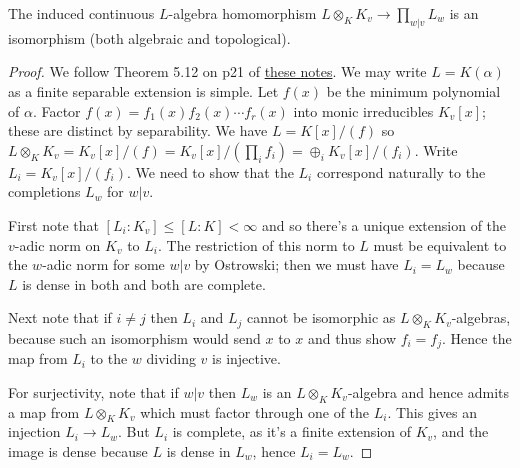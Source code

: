 \begin{theorem}
  \label{IsDedekindDomain.HeightOneSpectrum.adicCompletionComapAlgEquiv}
  The induced continuous $L$-algebra homomorphism $L\otimes_KK_v\to\prod_{w|v}L_w$ is an
  isomorphism (both algebraic and topological).
\end{theorem}
\begin{proof}
  We follow Theorem 5.12 on p21 of \href{https://math.berkeley.edu/~ltomczak/notes/Mich2022/LF_Notes.pdf}
  {these notes}. We may write $L=K(\alpha)$ as a finite separable extension is simple. Let $f(x)$
  be the minimum polynomial of $\alpha$. Factor $f(x)=f_1(x)f_2(x)\cdots f_r(x)$ into
  monic irreducibles $K_v[x]$; these are distinct by separability. We have $L=K[x]/(f)$
  so $L\otimes_KK_v=K_v[x]/(f)=K_v[x]/(\prod_i f_i)=\oplus_i K_v[x]/(f_i)$. Write
  $L_i=K_v[x]/(f_i)$. We need to show that the $L_i$ correspond naturally to the completions
  $L_w$ for $w|v$.

  First note that $[L_i:K_v]\leq [L:K]<\infty$ and so there's a unique extension of the $v$-adic
  norm on $K_v$ to $L_i$. The restriction of this norm to $L$ must be equivalent to the $w$-adic
  norm for some $w|v$ by Ostrowski; then we must have $L_i=L_w$ because $L$ is dense in both
  and both are complete.

  Next note that if $i\not=j$ then $L_i$ and $L_j$ cannot be isomorphic as $L\otimes_KK_v$-algebras,
  because such an isomorphism would send $x$ to $x$ and thus show $f_i=f_j$. Hence the map
  from $L_i$ to the $w$ dividing $v$ is injective.

  For surjectivity, note that if $w|v$ then $L_w$ is an $L\otimes_KK_v$-algebra and hence
  admits a map from $L\otimes_K K_v$ which must factor through one of the $L_i$.
  This gives an injection $L_i\to L_w$. But $L_i$ is complete, as it's a finite extension
  of $K_v$, and the image is dense because $L$ is dense in $L_w$, hence $L_i=L_w$.
\end{proof}

